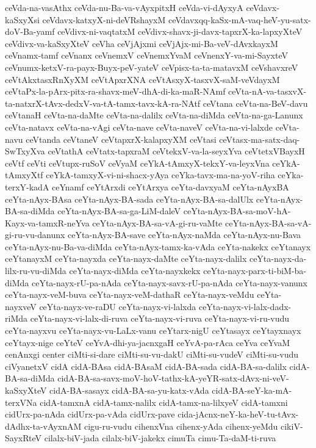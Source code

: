 {ceVda-na-vasAthx
ceVda-nu-Ba-va-vAyxpitxH
ceVda-vi-dAyxyA
ceVdavx-kaSxyXsi
ceVdavx-katxyX-ni-deVRshayxM
ceVdavxqq-kaSx-mA-vaq-heV-yu-satx-doV-Ba-yamf
ceVdivx-ni-vaqtatxM
ceVdivx-shavx-ji-davx-tapxrX-ka-lapxyXteV
ceVdivx-va-kaSxyXteV
ceVha
ceVjAjxmi
ceVjAjx-mi-Ba-veV-dAvxkayxM
ceVnamx-tamf
ceVnanx
ceVnemxV
ceVnemxYvaM
ceVnenxY-va-mi-SayxteV
ceVnumx-ketxV-ra-payx-Buyx-peV-yateV
ceVpisx-ta-ta-matavxM
ceVshavxreV
ceVtAkxtasxRnXyXM
ceVtApxrXNA
ceVtAsxyX-tasxvX-saM-veVdayxM
ceVtaPx-la-pArx-pitx-ra-shavx-meV-dhA-di-ka-maR-NAmf
ceVta-nA-va-tasxvX-ta-natxrX-tAvx-dedxV-va-tA-tamx-tavx-kA-ra-NAtf
ceVtana
ceVta-na-BeV-davu
ceVtanaH
ceVta-na-daMte
ceVta-na-dalilx
ceVta-na-diMda
ceVta-na-ga-Lanunx
ceVta-natavx
ceVta-na-vAgi
ceVta-nave
ceVta-naveV
ceVta-na-vi-lalxde
ceVta-navu
ceVtanda
ceVtaneV
ceVtapxrX-kalapxyXM
ceVtasi
ceVtasx-ma-satx-daq-SwTxyXva
ceVtathA
ceVtatx-tapxraM
ceVtekxV-va-la-seyxYva
ceVtetxVBayxH
ceVtf
ceVti
ceVtupx-ruSoV
ceVyaM
ceYkA-tAmxyX-tekxY-va-leyxVna
ceYkA-tAmxyXtf
ceYkA-tamxyX-vi-ni-shacx-yAya
ceYka-tavx-ma-na-yoV-riha
ceYka-terxY-kadA
ceYnamf
ceYtArxdi
ceYtArxya
ceYta-davxyaM
ceYta-nAyxBA
ceYta-nAyx-BAsa
ceYta-nAyx-BA-sada
ceYta-nAyx-BA-sa-dalUlx
ceYta-nAyx-BA-sa-diMda
ceYta-nAyx-BA-sa-ga-LiM-daleV
ceYta-nAyx-BA-sa-moV-hA-Kayx-va-tamxR-neYva
ceYta-nAyx-BA-sa-vA-gi-ru-vaMte
ceYta-nAyx-BA-sa-vA-gi-ru-vu-danunx
ceYta-nAyx-BA-save
ceYta-nAyx-naMda
ceYta-nAyx-nu-Bava
ceYta-nAyx-nu-Ba-va-diMda
ceYta-nAyx-tamx-ka-vAda
ceYta-nakekx
ceYtanayx
ceYtanayxM
ceYta-nayxda
ceYta-nayx-daMte
ceYta-nayx-dalilx
ceYta-nayx-da-lilx-ru-vu-diMda
ceYta-nayx-diMda
ceYta-nayxkekx
ceYta-nayx-parx-ti-biM-ba-diMda
ceYta-nayx-rU-pa-nAda
ceYta-nayx-savx-rU-pa-nAda
ceYta-nayx-vanunx
ceYta-nayx-veM-buva
ceYta-nayx-veM-dathaR
ceYta-nayx-veMdu
ceYta-nayxveV
ceYta-nayx-ve-raDU
ceYta-nayx-vi-lalxda
ceYta-nayx-vi-lalx-dadx-riMda
ceYta-nayx-vi-lalx-di-ruva
ceYta-nayx-vi-ruva
ceYta-nayx-vi-ru-vudu
ceYta-nayxvu
ceYta-nayx-vu-LaLx-vanu
ceYtarx-nigU
ceYtasayx
ceYtayxnayx
ceYtayx-nige
ceYteV
ceYvA-dhi-ya-jacnxgaH
ceYvA-pa-rAca
ceYva
ceYvaM
cenAnxgi
center
ciMti-si-dare
ciMti-su-vu-dakU
ciMti-su-vudeV
ciMti-su-vudu
ciVyanetxV
cidA
cidA-BAsa
cidA-BAsaM
cidA-BA-sada
cidA-BA-sa-dalilx
cidA-BA-sa-diMda
cidA-BA-sa-savx-moV-hoV-tathx-kA-yeYR-satx-dAvx-ni-veV-kaSxyXteV
cidA-BA-sasayx
cidA-BA-sa-yu-katx-vAda
cidA-BA-seY-ka-mA-terxVNa
cidA-tamxnA
cidA-tamx-nalilx
cidA-tamx-na-lilxyeV
cidA-tamxni
cidUrx-pa-nAda
cidUrx-pa-vAda
cidUrx-pave
cida-jAcnx-neY-ka-heV-tu-tAvx-dAdhx-ta-vAyxnAM
cigu-ru-vudu
cihenxVna
cihenx-yAda
cihenx-yeMdu
cikiV-SayxRteV
cilalx-biV-jada
cilalx-biV-jakekx
cimuTa
cimu-Ta-daM-ti-ruva
}
